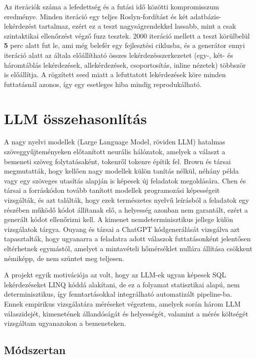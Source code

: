\documentclass[a4paper,12pt]{article}
\begin{document}
Az iterációk száma a lefedettség és a futási idő közötti kompromisszum eredménye. Minden iteráció egy teljes Roslyn-fordítást és két adatbázis-lekérdezést tartalmaz, ezért ez a teszt nagyságrendekkel lassabb, mint a csak szintaktikai ellenőrzést végző fuzz tesztek. 2000 iteráció mellett a teszt körülbelül \textbf{5} perc alatt fut le, ami még belefér egy fejlesztési ciklusba, és a generátor ennyi iteráció alatt az általa előállítható összes lekérdezésszerkezetet (egy-, két- és háromtáblás lekérdezések, allekérdezések, csoportosítás, inline nézetek) többször is előállítja. A rögzített seed miatt a lefuttatott lekérdezések köre minden futtatásnál azonos, így egy esetleges hiba mindig reprodukálható.

\section{LLM összehasonlítás}

A nagy nyelvi modellek (Large Language Model, röviden LLM) hatalmas szöveggyűjteményeken előtanított neurális hálózatok, amelyek a választ a bemeneti szöveg folytatásaként, tokenről tokenre építik fel. Brown és társai \cite{brown2020gpt3} megmutatták, hogy kellően nagy modellek külön tanítás nélkül, néhány példa vagy egy szöveges utasítás alapján is képesek új feladatok megoldására. Chen és társai \cite{chen2021codex} a forráskódon tovább tanított modellek programozási képességeit vizsgálták, és azt találták, hogy ezek természetes nyelvű leírásból a feladatok egy részében működő kódot állítanak elő, a helyesség azonban nem garantált, ezért a generált kódot ellenőrizni kell. A kimenet nemdeterminisztikus jellege külön vizsgálatok tárgya. Ouyang és társai \cite{ouyang2025nondeterminism} a ChatGPT kódgenerálását vizsgálva azt tapasztalták, hogy ugyanarra a feladatra adott válaszok futtatásonként jelentősen eltérhetnek egymástól, amelyet a mintavételi hőmérséklet nullára állítása csökkent némiképp, de nem szüntet meg teljesen.

A projekt egyik motivációja az volt, hogy az LLM-ek ugyan képesek SQL lekérdezéseket LINQ kóddá alakítani, de ez a folyamat statisztikai alapú, nem determinisztikus, így fenntartásokkal integrálható automatizált pipeline-ba. Ennek empirikus vizsgálatára méréseket végeztem, amelyek során három LLM válaszidejét, kimenetének állandóságát és helyességét, valamint a mérés költségét vizsgáltam ugyanazokon a bemeneteken.

\subsection{Módszertan}
\end{document}
